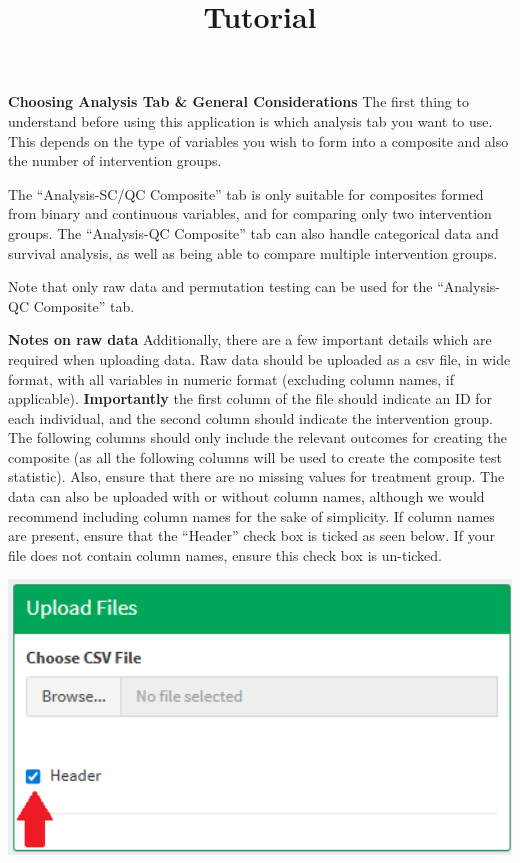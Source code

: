 \documentclass[
]{article}
\title{Tutorial}
\author{}
\date{\vspace{-2.5em}}
\begin{document}
\maketitle

\textbf{Choosing Analysis Tab \& General Considerations} The first thing
to understand before using this application is which analysis tab you
want to use. This depends on the type of variables you wish to form into
a composite and also the number of intervention groups.

The ``Analysis-SC/QC Composite'' tab is only suitable for composites
formed from binary and continuous variables, and for comparing only two
intervention groups. The ``Analysis-QC Composite'' tab can also handle
categorical data and survival analysis, as well as being able to compare
multiple intervention groups.

Note that only raw data and permutation testing can be used for the
``Analysis-QC Composite'' tab.

\textbf{Notes on raw data} Additionally, there are a few important
details which are required when uploading data. Raw data should be
uploaded as a csv file, in wide format, with all variables in numeric
format (excluding column names, if applicable). \textbf{Importantly} the
first column of the file should indicate an ID for each individual, and
the second column should indicate the intervention group. The following
columns should only include the relevant outcomes for creating the
composite (as all the following columns will be used to create the
composite test statistic). Also, ensure that there are no missing values
for treatment group. The data can also be uploaded with or without
column names, although we would recommend including column names for the
sake of simplicity. If column names are present, ensure that the
``Header'' check box is ticked as seen below. If your file does not
contain column names, ensure this check box is un-ticked.

\begin{center}\includegraphics[width=5.49in]{Upload Files} \end{center}
\end{document}
